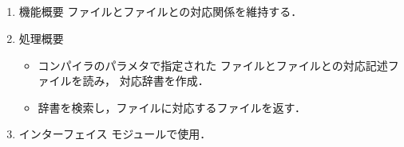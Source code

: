 \subsection{}
\begin{enumerate}
\item 機能概要 ファイルとファイルとの対応関係を維持する．
\item 処理概要 
\begin{itemize}
\item \smlsharp{}コンパイラのパラメタで指定された
ファイルとファイルとの対応記述ファイルを読み，
対応辞書を作成．
\item 辞書を検索し，ファイルに対応するファイルを返す．
\end{itemize}
\item インターフェイス モジュールで使用．
\end{enumerate}

